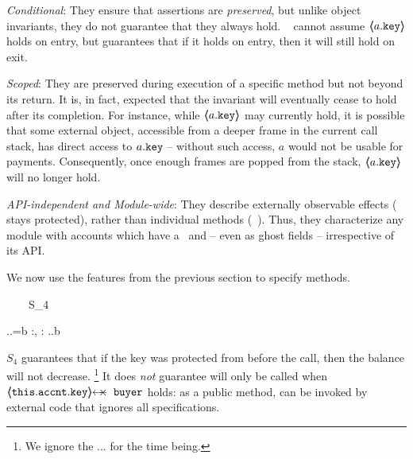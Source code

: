  \begin{customquote}
 \vspace{.05cm}
\noindent
\emph{Conditional}:   They ensure that assertions are \emph{preserved}, but unlike object invariants, they do not guarantee that they always hold.
\ \Eg   {} cannot assume $\langle\!\!\langle a.\mbox{\normalfont{\texttt{key}}} \rangle\!\!\rangle$ holds on entry, but   guarantees that if it holds on entry, then  it will still hold on exit.

\vspace{.05cm}
\noindent
\emph{Scoped}:  %
They are preserved during  execution of a specific method but not beyond its return. It is, in fact, expected that the invariant will eventually cease to hold after its completion. For instance, while $\langle\!\!\langle a.\mbox{\normalfont{\texttt{key}}} \rangle\!\!\rangle$ may currently hold, it is possible that some external object, accessible from a deeper frame in the current call stack, has direct access to $a.\mbox{\normalfont{\texttt{key}}}$ -- without such access, $a$ would not be usable for payments. Consequently, once enough frames are popped from the stack, $\langle\!\!\langle a.\mbox{\normalfont{\texttt{key}}} \rangle\!\!\rangle$  will no longer hold.

 \vspace{.05cm}
\noindent
\emph{API-independent and Module-wide}: They describe  externally observable effects (\eg  {} stays protected), 
 rather than    individual methods (\eg\, ). %
Thus,   they   characterize  any 
module with  accounts which have a %
 \balance~and  \prg{\password} -- even as ghost fields --  irrespective of  its API. %
 \end{customquote}
 
 \begin{example}
 We   now use the features from the previous section to specify methods. 

{\sprepostShort
		{\strut \ \ \ \ S_4} 
		{    {} \wedge {}.\prg{\myAccount}.\prg{\balance}=b
		 }
		{} {} {:, : }
		{ 
		  .\prg{\myAccount}.\prg{\balance}\geq b
		} 
		}

\noindent
$S_4$  guarantees that if the  key was protected from  before the call, then the balance will not decrease. 
\footnote{We ignore the ... for the time being.}
 It does \emph{not} guarantee  will only be called when $\protectedFrom{\prg{this}.\prg{\myAccount}.\prg{key}} {\prg{buyer}}$ holds: 
as a  public method,    can be invoked by external code that ignores all specifications.
\end{example}

